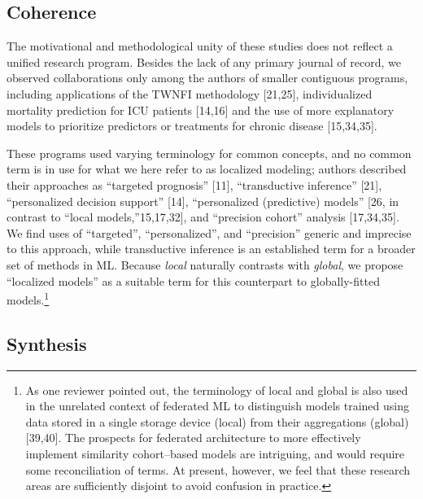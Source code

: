\documentclass[preprint, 3p,
authoryear]{elsarticle} %
\begin{document}
\hypertarget{coherence}{%
\subsection{Coherence}\label{coherence}}

The motivational and methodological unity of these studies does not
reflect a unified research program. Besides the lack of any primary
journal of record, we observed collaborations only among the authors of
smaller contiguous programs, including applications of the TWNFI
methodology {[}21,25{]}, individualized mortality prediction for ICU
patients {[}14,16{]} and the use of more explanatory models to
prioritize predictors or treatments for chronic disease {[}15,34,35{]}.

These programs used varying terminology for common concepts, and no
common term is in use for what we here refer to as localized modeling;
authors described their approaches as ``targeted prognosis'' {[}11{]},
``transductive inference'' {[}21{]}, ``personalized decision support''
{[}14{]}, ``personalized (predictive) models'' {[}26, in contrast to
``local models,''15,17,32{]}, and ``precision cohort'' analysis
{[}17,34,35{]}. We find uses of ``targeted'', ``personalized'', and
``precision'' generic and imprecise to this approach, while transductive
inference is an established term for a broader set of methods in ML.
Because \emph{local} naturally contrasts with \emph{global}, we propose
``localized models'' as a suitable term for this counterpart to
globally-fitted models.\footnote{As one reviewer pointed out, the
  terminology of local and global is also used in the unrelated context
  of federated ML to distinguish models trained using data stored in a
  single storage device (local) from their aggregations (global)
  {[}39,40{]}. The prospects for federated architecture to more
  effectively implement similarity cohort--based models are intriguing,
  and would require some reconciliation of terms. At present, however,
  we feel that these research areas are sufficiently disjoint to avoid
  confusion in practice.}

\hypertarget{synthesis-1}{%
\subsection{Synthesis}\label{synthesis-1}}
\end{document}
